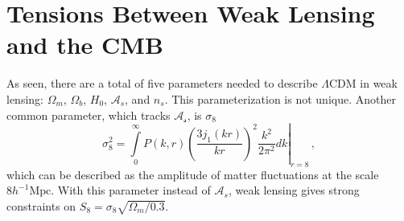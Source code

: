 \section{Tensions Between Weak Lensing and the CMB}
As seen, there are a total of five parameters needed to describe $\Lambda$CDM in weak lensing: $\Omega_m$, $\Omega_b$, $H_0$, $\mathcal{A}_s$, and $n_s$. This parameterization is not unique. Another common parameter, which tracks $\mathcal{A_s}$, is $\sigma_8$
\begin{equation}
	\sigma_8^2 = \left.\int\limits_0^\infty P(k,r)\left(\frac{3j_1(kr)}{kr}\right)^2\frac{k^2}{2\pi^2}dk\right|_{r=8}\,,
\end{equation}
which can be described as the amplitude of matter fluctuations at the scale $8 h^{-1}\mathrm{Mpc}$. With this parameter instead of $\mathcal{A}_s$, weak lensing gives strong constraints on $S_8 = \sigma_8\sqrt{\Omega_m/0.3}$. 

